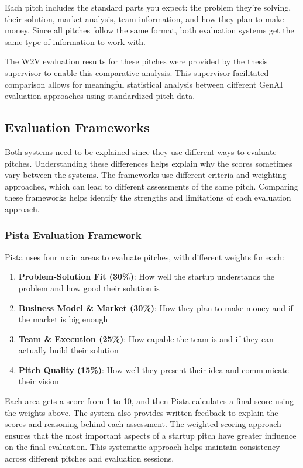 Each pitch includes the standard parts you expect: the problem they're solving, their solution, market analysis, team information, and how they plan to make money. Since all pitches follow the same format, both evaluation systems get the same type of information to work with.

The W2V evaluation results for these pitches were provided by the thesis supervisor to enable this comparative analysis. This supervisor-facilitated comparison allows for meaningful statistical analysis between different GenAI evaluation approaches using standardized pitch data.

\subsection{Evaluation Frameworks}
\label{subsec:frameworks}

Both systems need to be explained since they use different ways to evaluate pitches. Understanding these differences helps explain why the scores sometimes vary between the systems. The frameworks use different criteria and weighting approaches, which can lead to different assessments of the same pitch. Comparing these frameworks helps identify the strengths and limitations of each evaluation approach.

\subsubsection{Pista Evaluation Framework}

Pista uses four main areas to evaluate pitches, with different weights for each:

\begin{enumerate}
    \item \textbf{Problem-Solution Fit (30\%)}: How well the startup understands the problem and how good their solution is
    \item \textbf{Business Model \& Market (30\%)}: How they plan to make money and if the market is big enough
    \item \textbf{Team \& Execution (25\%)}: How capable the team is and if they can actually build their solution
    \item \textbf{Pitch Quality (15\%)}: How well they present their idea and communicate their vision
\end{enumerate}

Each area gets a score from 1 to 10, and then Pista calculates a final score using the weights above. The system also provides written feedback to explain the scores and reasoning behind each assessment. The weighted scoring approach ensures that the most important aspects of a startup pitch have greater influence on the final evaluation. This systematic approach helps maintain consistency across different pitches and evaluation sessions.

